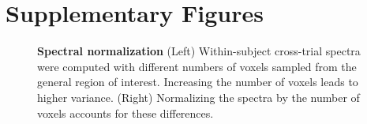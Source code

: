 \documentclass[10pt]{article}
\begin{document}
\section*{Supplementary Figures}\label{supplementary-figures}

\setcounter{figure}{0}
\renewcommand{\thefigure}{S\arabic{figure}}

\begin{figure}[H]


\caption{\label{fig-vary-n-voxels}\textbf{Spectral normalization} (Left)
Within-subject cross-trial spectra were computed with different numbers
of voxels sampled from the general region of interest. Increasing the
number of voxels leads to higher variance. (Right) Normalizing the
spectra by the number of voxels accounts for these differences.}

\end{figure}%
\end{document}
